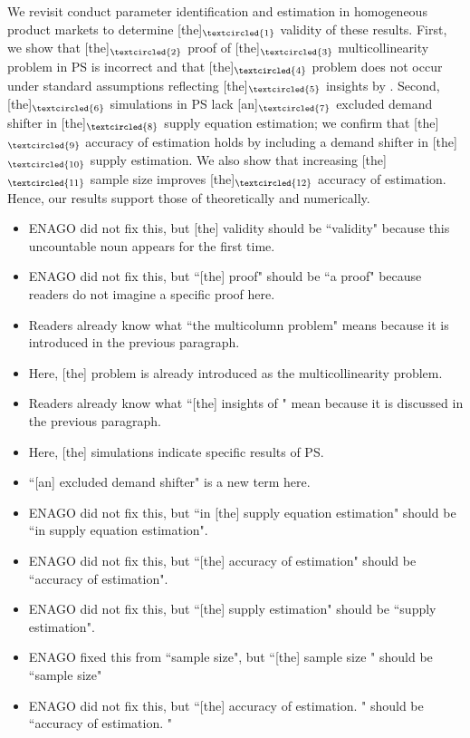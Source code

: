 \documentclass[11pt, a4paper]{article}
\begin{document}
\newpage
[Paragraph 4]

We revisit conduct parameter identification and estimation in homogeneous product markets to determine [the]$_{\textcircled{1}}$ validity of these results.
First, we show that [the]$_{\textcircled{2}}$ proof of [the]$_{\textcircled{3}}$ multicollinearity problem in PS is incorrect and that [the]$_{\textcircled{4}}$ problem does not occur under standard assumptions reflecting [the]$_{\textcircled{5}}$ insights by \citet{bresnahan1982oligopoly}.
Second, [the]$_{\textcircled{6}}$ simulations in PS lack [an]$_{\textcircled{7}}$ excluded demand shifter in [the]$_{\textcircled{8}}$ supply equation estimation; we confirm that [the]$_{\textcircled{9}}$ accuracy of estimation holds by including a demand shifter in [the]$_{\textcircled{10}}$ supply estimation. 
We also show that increasing [the]$_{\textcircled{11}}$ sample size improves [the]$_{\textcircled{12}}$ accuracy of estimation. 
Hence, our results support those of \cite{bresnahan1982oligopoly} theoretically and numerically.
\begin{itemize}
    \item[\textcircled{1}] ENAGO did not fix this, but [the] validity should be ``validity" because this uncountable noun appears for the first time.
    \item[\textcircled{2}] ENAGO did not fix this, but ``[the] proof" should be ``a proof" because readers do not imagine a specific proof here.
    \item[\textcircled{3}] Readers already know what ``the multicolumn problem" means because it is introduced in the previous paragraph.
    \item[\textcircled{4}] Here, [the] problem is already introduced as the multicollinearity problem. 
    \item[\textcircled{5}] Readers already know what ``[the] insights of \citet{bresnahan1982oligopoly}" mean because it is discussed in the previous paragraph.
    \item[\textcircled{6}] Here, [the] simulations indicate specific results of PS. 
    \item[\textcircled{7}] ``[an] excluded demand shifter" is a new term here.
    \item[\textcircled{8}] ENAGO did not fix this, but ``in [the] supply equation estimation" should be ``in supply equation estimation".
    \item[\textcircled{9}] ENAGO did not fix this, but ``[the] accuracy of estimation" should be ``accuracy of estimation".
    \item[\textcircled{10}] ENAGO did not fix this, but ``[the] supply estimation" should be ``supply estimation".
    \item[\textcircled{11}] ENAGO fixed this from ``sample size", but ``[the] sample size " should be ``sample size"
    \item[\textcircled{12}] ENAGO did not fix this, but ``[the] accuracy of estimation. " should be ``accuracy of estimation. "

\end{itemize}
\end{document}

